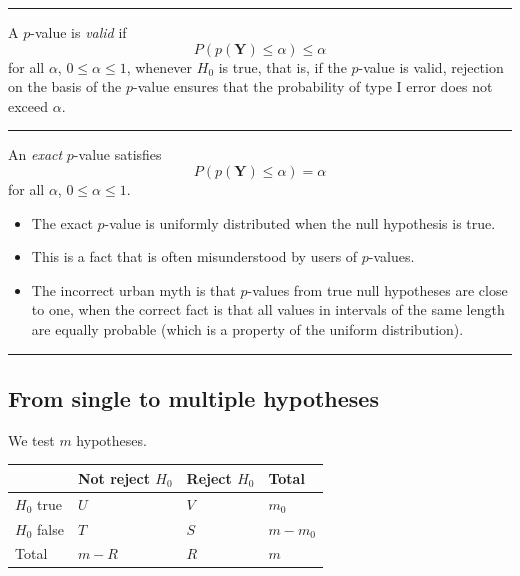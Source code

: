 \documentclass[
  letterpaper,
  DIV=11,
  numbers=noendperiod]{scrartcl}
\providecommand{\tightlist}{%
  \setlength{\itemsep}{0pt}\setlength{\parskip}{0pt}}\usepackage{longtable,booktabs,array}
\begin{document}
\begin{center}\rule{0.5\linewidth}{0.5pt}\end{center}

A \(p\)-value is \emph{valid} if
\[ P(p(\boldsymbol{Y}) \leq \alpha) \leq \alpha \] for all \(\alpha\),
\(0 \leq \alpha \leq 1\), whenever \(H_0\) is true, that is, if the
\(p\)-value is valid, rejection on the basis of the \(p\)-value ensures
that the probability of type I error does not exceed \(\alpha\).

\begin{center}\rule{0.5\linewidth}{0.5pt}\end{center}

An \emph{exact} \(p\)-value satisfies
\[P(p(\boldsymbol{Y}) \leq \alpha) = \alpha\] for all \(\alpha\),
\(0 \leq \alpha \leq 1\).

\begin{itemize}
\tightlist
\item
  The exact \(p\)-value is uniformly distributed when the null
  hypothesis is true.
\item
  This is a fact that is often misunderstood by users of \(p\)-values.
\item
  The incorrect urban myth is that \(p\)-values from true null
  hypotheses are close to one, when the correct fact is that all values
  in intervals of the same length are equally probable (which is a
  property of the uniform distribution).
\end{itemize}

\begin{center}\rule{0.5\linewidth}{0.5pt}\end{center}

\hypertarget{from-single-to-multiple-hypotheses}{%
\subsection{From single to multiple
hypotheses}\label{from-single-to-multiple-hypotheses}}

We test \(m\) hypotheses.

\begin{longtable}[]{@{}llll@{}}
\toprule()
& Not reject \(H_0\) & Reject \(H_0\) & Total \\
\midrule()
\endhead
\(H_0\) true & \(U\) & \(V\) & \(m_0\) \\
\(H_0\) false & \(T\) & \(S\) & \(m - m_0\) \\
Total & \(m-R\) & \(R\) & \(m\) \\
\bottomrule()
\end{longtable}
\end{document}
